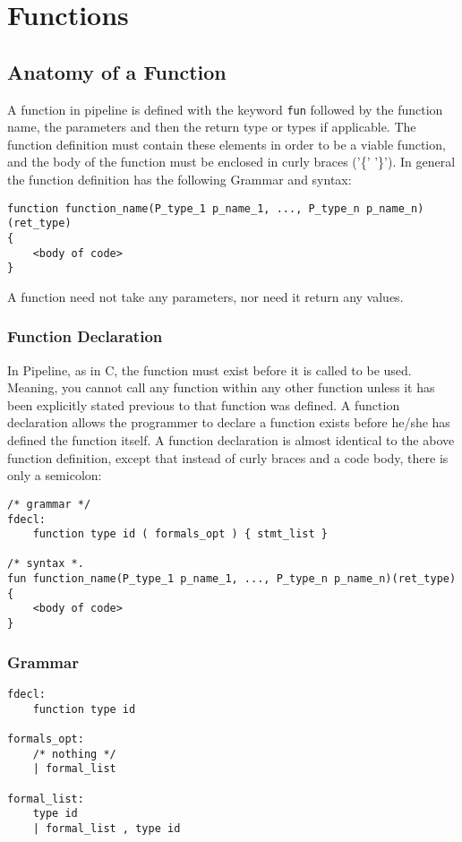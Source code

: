 \documentclass[./LRM_main.tex]{subfiles}
\begin{document}
\section{Functions}
\subsection{Anatomy of a Function}
A function in pipeline is defined with the keyword \texttt{fun} followed by the function name, the parameters and then the return type or types if applicable. The function definition must contain these elements in order to be a viable function, and the body of the function must be enclosed in curly braces ('\{' '\}'). In general the function definition has the following Grammar and syntax:\\
\begin{lstlisting}
function function_name(P_type_1 p_name_1, ..., P_type_n p_name_n)(ret_type)
{
	<body of code>
}
\end{lstlisting}
A function need not take any parameters, nor need it return any values.
\subsubsection{Function Declaration}
In Pipeline, as in C, the function must exist before it is called to be used. Meaning, you cannot call any function within any other function unless it has been explicitly stated previous to that function was defined. A function declaration allows the programmer to declare a function exists before he/she has defined the function itself. A function declaration is almost identical to the above function definition, except that instead of curly braces and a code body, there is only a semicolon:
\begin{lstlisting}
/* grammar */
fdecl:
    function type id ( formals_opt ) { stmt_list }

/* syntax *.
fun function_name(P_type_1 p_name_1, ..., P_type_n p_name_n)(ret_type)
{
	<body of code>
}
\end{lstlisting}
\subsubsection{Grammar}
\begin{lstlisting}
fdecl:
    function type id

formals_opt:
    /* nothing */ 
    | formal_list  

formal_list:
    type id
    | formal_list , type id 

\end{lstlisting}
\end{document}
